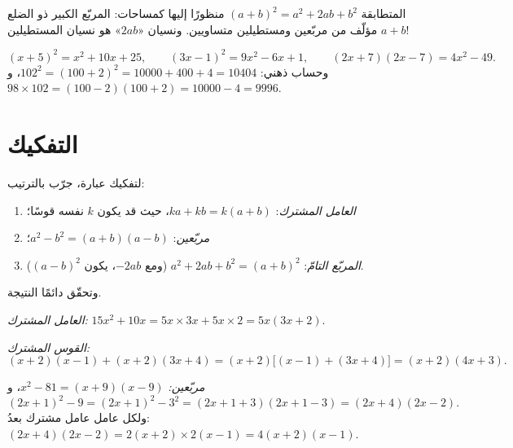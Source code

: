 \begin{omfigure}

{\small المتطابقة $(a+b)^2 = a^2 + 2ab + b^2$ منظورًا إليها
كمساحات: المربّع الكبير ذو الضلع $a+b$ مؤلّف من مربّعين
ومستطيلين متساويين. ونسيان «$2ab$» هو نسيان المستطيلين!}
\end{omfigure}

\begin{example}\label{ex:g9:algebra:identities}
\[
(x + 5)^2 = x^2 + 10x + 25, \qquad
(3x - 1)^2 = 9x^2 - 6x + 1, \qquad
(2x + 7)(2x - 7) = 4x^2 - 49 .
\]
وحساب ذهني: $102^2 = (100 + 2)^2 = 10000 + 400 + 4 = 10404$،
و $98 \times 102 = (100-2)(100+2) = 10000 - 4 = 9996$.
\end{example}

\section{التفكيك}

\begin{method}[التفكيك]\label{met:g9:algebra:factor}
لتفكيك عبارة، جرّب بالترتيب:
\begin{enumerate}
  \item \emph{العامل المشترك}: $ka + kb = k(a + b)$، حيث قد يكون
        $k$ نفسه قوسًا؛
  \item \emph{ مربّعين}: $a^2 - b^2 = (a+b)(a-b)$؛
  \item \emph{المربّع التامّ}: $a^2 + 2ab + b^2 = (a+b)^2$ (ومع
        $-2ab$، يكون $(a-b)^2$).
\end{enumerate}
وتحقّق دائمًا  النتيجة.
\end{method}

\begin{example}\label{ex:g9:algebra:factor}
\emph{العامل المشترك:}
$15x^2 + 10x = 5x \times 3x + 5x \times 2 = 5x(3x + 2)$.

\emph{القوس المشترك:}
\[
(x+2)(x-1) + (x+2)(3x+4) = (x+2)\bigl[(x-1) + (3x+4)\bigr]
= (x+2)(4x+3).
\]

\emph{ مربّعين:}
$x^2 - 81 = (x+9)(x-9)$، و
\[
(2x+1)^2 - 9 = (2x+1)^2 - 3^2 = (2x+1+3)(2x+1-3) = (2x+4)(2x-2).
\]
ولكل عامل عامل مشترك بعدُ: $(2x+4)(2x-2) = 2(x+2) \times
2(x-1) = 4(x+2)(x-1)$.
\end{example}

